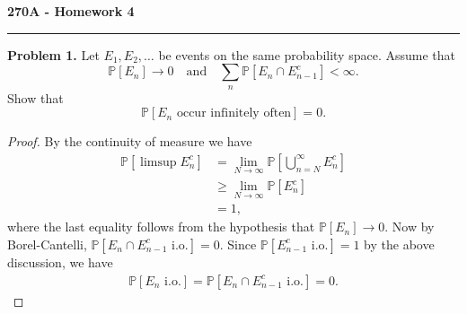 \documentclass[11pt,letterpaper]{report}
\newcommand{\Prob}{\mathbb{P}}
\begin{document}
\begin{center}
{\bf \Large 270A - Homework 4}
\vspace{0.2cm}
\hrule
\end{center}

\noindent\textbf{Problem 1. }
Let $E_1, E_2, \ldots$ be events on the same probability space. Assume that
\[
\Prob[E_n]\to 0\quad\text{and}\quad \sum_n\Prob[E_n\cap E_{n-1}^c]<\infty.
\]
Show that
\[
\Prob[E_n\text{ occur infinitely often}] = 0.
\]
\begin{proof}
	By the continuity of measure we have
	\begin{align*}
		\Prob[\limsup E_n^c] &= \lim_{N\to \infty}\Prob\left[\bigcup_{n=N}^\infty E_n^c\right]\\
		&\geq \lim_{N\to \infty}\Prob[E_n^c]\\
		&= 1,
	\end{align*}
	where the last equality follows from the hypothesis that $\Prob[E_n]\to 0$. Now by Borel-Cantelli, $\Prob[E_n\cap E_{n-1}^c\text{ i.o.}] = 0$. Since $\Prob[E_{n-1}^c\text{ i.o.}] = 1$ by the above discussion, we have
	\begin{align*}
		\Prob[E_n\text{ i.o.}] = \Prob[E_n\cap E_{n-1}^c\text{ i.o.}]= 0.
	\end{align*}
\end{proof}
\end{document}
